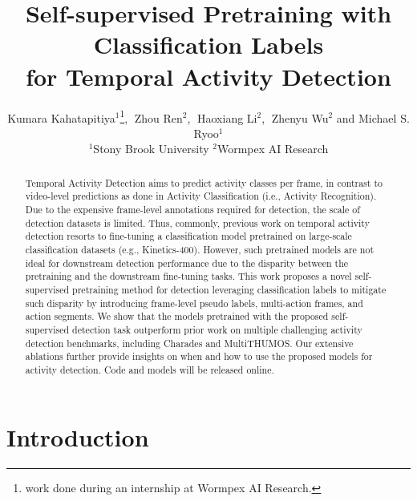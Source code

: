\documentclass[10pt,twocolumn,letterpaper]{article}
\begin{document}
\title{Self-supervised Pretraining with Classification Labels \\for Temporal Activity Detection \vspace{-2mm}}

\author{Kumara Kahatapitiya$^1$\thanks{work done during an internship at Wormpex AI Research.},$\;$ Zhou Ren$^2$,$\;$ Haoxiang Li$^2$,$\;$ Zhenyu Wu$^2$ and Michael S. Ryoo$^1$\\
$^1$Stony Brook University \hspace{3mm} $^2$Wormpex AI Research\\%
}

\maketitle


\begin{abstract}
	\vspace{-3mm}
	
	Temporal Activity Detection aims to predict activity classes per frame, in contrast to video-level predictions as done in Activity Classification (i.e., Activity Recognition). Due to the expensive frame-level annotations required for detection, the scale of detection datasets is limited. Thus, commonly, previous work on temporal activity detection resorts to fine-tuning a classification model pretrained on large-scale classification datasets (e.g., Kinetics-400). However, such pretrained models are not ideal for downstream detection performance due to the disparity between the pretraining and the downstream fine-tuning tasks. This work proposes a novel self-supervised pretraining method for detection leveraging classification labels to mitigate such disparity by introducing frame-level pseudo labels, multi-action frames, and action segments. We show that the models pretrained with the proposed self-supervised detection task outperform prior work on multiple challenging activity detection benchmarks, including Charades and MultiTHUMOS. Our extensive ablations further provide insights on when and how to use the proposed models for activity detection. Code and models will be released online.
	\vspace{-5mm}
\end{abstract}


\section{Introduction}
\end{document}

